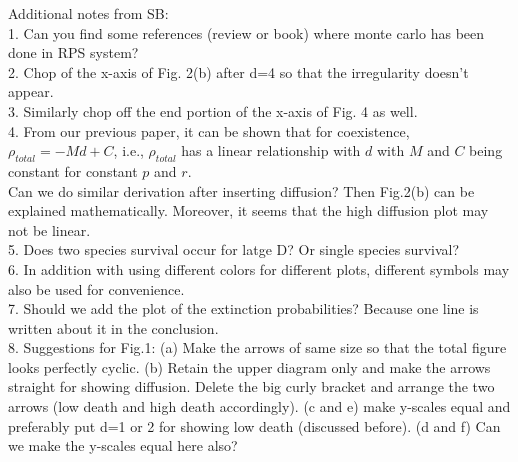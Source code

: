 \documentclass[aps, pre, twocolumn, amsmath, superscriptaddress,showkeys,showpacs]{revtex4-1}
\begin{document}
	{\color{blue} Additional notes from SB:\\
	1. Can you find some references (review or book) where monte carlo has been done in RPS system?\\
	2. Chop of the x-axis of Fig. 2(b) after d=4 so that the irregularity doesn't appear. \\
	3. Similarly chop off the end portion of the x-axis of Fig. 4 as well. \\
	4. From our previous paper, it can be shown that for coexistence, $\rho_{total}=-Md +C$, i.e., $\rho_{total}$ has a linear relationship with $d$ with $M$ and $C$ being constant for constant $p$ and $r$. \\
	Can we do similar derivation after inserting diffusion? Then Fig.2(b) can be explained mathematically. Moreover, it seems that the high diffusion plot may not be linear. \\
	5. Does two species survival occur for latge D? Or single species survival? \\
	6. In addition with using different colors for different plots, different symbols may also be used for convenience. \\
	7. Should we add the plot of the extinction probabilities? Because one line is written about it in the conclusion. \\
	8. Suggestions for Fig.1: (a) Make the arrows of same size so that the total figure looks perfectly cyclic. (b) Retain the upper diagram only and make the arrows straight for showing diffusion. Delete the big curly bracket and arrange the two arrows (low death and high death accordingly). (c and e) make y-scales equal and preferably put d=1 or 2 for showing low death (discussed before). (d and f) Can we make the y-scales equal here also?
	}
	
	
\end{document}
